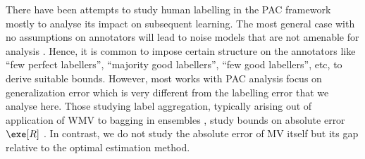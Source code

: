

There have been attempts to study human labelling in the PAC framework mostly to analyse its impact on subsequent learning. The most general case with no assumptions on annotators will lead to noise models that are not amenable for analysis \cite{awasthi2017efficient,rivest1994formal}. Hence, it is common to impose certain structure on the annotators like ``few perfect labellers'', ``majority good labellers'', ``few good labellers'', etc, to derive suitable bounds. However, most works with PAC analysis focus on generalization error \cite{awasthi2017efficient} which is very different from the labelling error that we analyse here. Those studying label aggregation, typically arising out of application of WMV to bagging in ensembles \cite{breiman1996bagging}, study bounds on absolute error $\exe[R]$ \cite{masegosa2020second}. In contrast, we do not study the absolute error of MV itself but its gap relative to the optimal estimation method.


